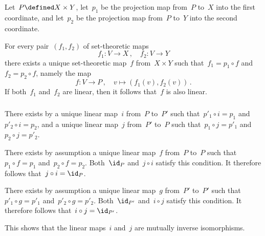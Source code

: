 \subsection{}


\subsubsection{}

Let~$P \defined X \times Y$, let~$p_1$ be the projection map from~$P$ to~$X$ into the first coordinate, and let~$p_2$ be the projection map from~$P$ to~$Y$ into the second coordinate.

For every pair~$(f_1, f_2)$ of set-theoretic maps
\[
	f_1 \colon V \to X \,,
	\quad
	f_2 \colon V \to Y
\]
there exists a unique set-theoretic map~$f$ from~$X \times Y$ such that~$f_1 = p_1 \circ f$ and~$f_2 = p_2 \circ f$, namely the map
\[
	f
	\colon
	V
	\to
	P \,,
	\quad
	v
	\mapsto
	( f_1(v), f_2(v) ) \,.
\]
If both~$f_1$ and~$f_2$ are linear, then it follows that~$f$ is also linear.





\subsubsection{}

There exists by a unique linear map~$i$ from~$P$ to~$P'$ such that~$p'_1 \circ i = p_1$ and~$p'_2 \circ i = p_2$, and a unique linear map~$j$ from~$P'$ to~$P$ such that~$p_1 \circ j = p'_1$ and~$p_2 \circ j = p'_2$.

There exists by assumption a unique linear map~$f$ from~$P$ to~$P$ such that~$p_1 \circ f = p_1$ and~$p_2 \circ f = p_2$.
Both~$\id_P$ and~$j \circ i$ satisfy this condition.
It therefore follows that~$j \circ i = \id_P$.

There exists by assumption a unique linear map~$g$ from~$P'$ to~$P'$ such that~$p'_1 \circ g = p'_1$ and~$p'_2 \circ g = p'_2$.
Both~$\id_{P'}$ and~$i \circ j$ satisfy this condition.
It therefore follows that~$i \circ j = \id_{P'}$.

This shows that the linear maps~$i$ and~$j$ are mutually inverse isomorphisms.





\subsubsection{}


